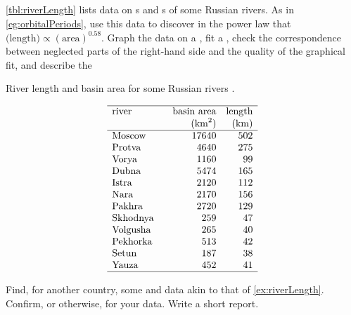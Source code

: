 \begin{exercise} \label{ex:riverLength} 
\cref{tbl:riverLength} lists data on s and s of some Russian rivers. 
As in \cref{eg:orbitalPeriods}, use this data to discover  in the power law that \(\text{(length)}\propto(\text{area})^{0.58}\).  
Graph the data on a , fit a , check the correspondence between neglected parts of the right-hand side and the quality of the graphical fit, and describe the 
\setbox\ajrqrbox\hbox{}%
\marginajrbox%
\begin{table}
\caption{River length and basin area for some Russian rivers \cite[p.154]{Arnold2014}.}
\label{tbl:riverLength}
\begin{equation*}
\begin{array}{p{12ex}rr} \hline
river&\text{basin area}&\text{length}\\
&(\text{km}^2)&\text{(km)}\\\hline
Moscow& 17640 & 502 \\
Protva& 4640 & 275 \\
Vorya& 1160 & 99 \\
Dubna& 5474 & 165 \\
Istra& 2120 & 112 \\
Nara& 2170 & 156 \\
Pakhra& 2720 & 129 \\
Skhodnya& 259 & 47 \\
Volgusha& 265 & 40 \\
Pekhorka& 513 & 42 \\
Setun& 187 & 38 \\
Yauza& 452 & 41 \\
\hline
\end{array}
\end{equation*}
\end{table}%
\end{exercise}

\begin{exercise} \label{ex:riverLength2} 
Find, for another country, some  and  data akin to that of \cref{ex:riverLength}.
Confirm, or otherwise,  for your data.  
Write a short report.
\end{exercise}


